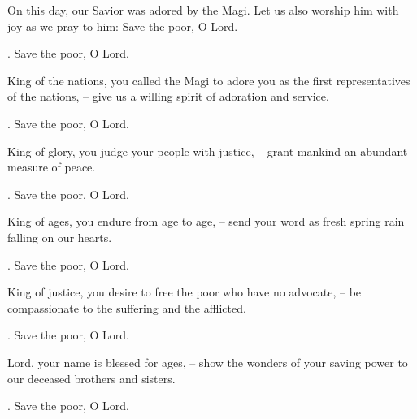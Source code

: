 \lettrine[loversize=0.15,lines=2]{O}{}n this day, our Savior was adored by the Magi. Let us also worship him with joy as we pray to him: Save the poor, O Lord.
\par \Rbar. Save the poor, O Lord.

King of the nations, you called the Magi to adore you as the first representatives of the nations,
– give us a willing spirit of adoration and service.
\par \Rbar. Save the poor, O Lord.

King of glory, you judge your people with justice,
– grant mankind an abundant measure of peace.
\par \Rbar. Save the poor, O Lord.

King of ages, you endure from age to age,
– send your word as fresh spring rain falling on our hearts.
\par \Rbar. Save the poor, O Lord.

King of justice, you desire to free the poor who have no advocate,
– be compassionate to the suffering and the afflicted.
\par \Rbar. Save the poor, O Lord.

Lord, your name is blessed for ages,
– show the wonders of your saving power to our deceased brothers and sisters.
\par \Rbar. Save the poor, O Lord.